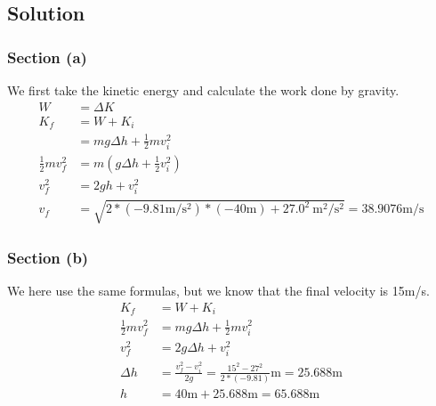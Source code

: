 \documentclass[12pt]{article}
\begin{document}
\subsection*{Solution}
\subsubsection*{Section (a)}
We first take the kinetic energy and calculate the work done by gravity.
\begin{align*}
    W   &= \Delta K\\
    K_f &= W + K_i\\
        &=  mg \Delta h + \frac{1}{2}mv_i^2\\
    \frac{1}{2}mv_f^2   &= m(g \Delta h + \frac{1}{2}v_i^2)\\
    v_f^2   &=  2gh + v_i^2\\
    v_f &=  \sqrt{  2*(-9.81\unit{\meter/\second^2})*(-40\unit{\meter}) + 27.0^2\ \unit{\meter^2/\second^2} } = \boxed{38.9076\unit{\meter/\second}}
\end{align*}

\subsubsection*{Section (b)}
We here use the same formulas, but we know that the final velocity is 15\unit{\meter/\second}.
\begin{align*}
    K_f &= W + K_i\\
    \frac{1}{2}mv_f^2   &=  mg \Delta h + \frac{1}{2}mv_i^2\\
    v_f^2   &=  2g \Delta h + v_i^2\\
    \Delta h    &=  \frac{v_f^2 - v_i^2}{2g} 
        =   \frac{15^2 - 27^2}{2*(-9.81)} \unit{\meter} 
        =  25.688\unit{\meter}\\
    h   &=  40\unit{\meter} + 25.688\unit{\meter} = \boxed{65.688\unit{\meter}}
\end{align*}
\end{document}

